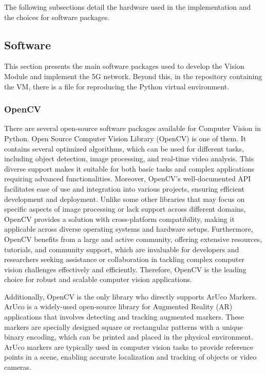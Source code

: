 The following subsections detail the hardware used in the implementation and the choices for software packages.


\subsection{Software}\label{subsec:software}
This section presents the main software packages used to develop the Vision Module and implement the 5G network.
Beyond this, in the repository containing the VM, there is a file for reproducing the Python virtual environment.

\subsubsection{OpenCV}
There are several open-source software packages available for Computer Vision in Python.
Open Source Computer Vision Library (OpenCV) is one of them.
It contains several optimized algorithms, which can be used for different tasks, including object detection, image processing, and real-time video analysis.
This diverse support makes it suitable for both basic tasks and complex applications requiring advanced functionalities.
Moreover, OpenCV's well-documented API facilitates ease of use and integration into various projects, ensuring efficient development and deployment.
Unlike some other libraries that may focus on specific aspects of image processing or lack support across different domains, OpenCV provides a solution with cross-platform compatibility, making it applicable across diverse operating systems and hardware setups.
Furthermore, OpenCV benefits from a large and active community, offering extensive resources, tutorials, and community support, which are invaluable for developers and researchers seeking assistance or collaboration in tackling complex computer vision challenges effectively and efficiently.
Therefore, OpenCV is the leading choice for robust and scalable computer vision applications.

Additionally, OpenCV is the only library who directly supports ArUco Markers.
ArUco is a widely-used open-source library for Augmented Reality (AR) applications that involves detecting and tracking augmented markers.
These markers are specially designed square or rectangular patterns with a unique binary encoding, which can be printed and placed in the physical environment.
ArUco markers are typically used in computer vision tasks to provide reference points in a scene, enabling accurate localization and tracking of objects or video cameras.

